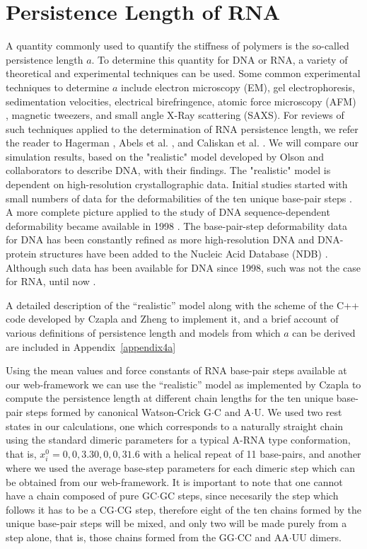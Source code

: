 \section{Persistence Length of RNA}
A quantity commonly used to  quantify the stiffness of polymers is the
so-called persistence  length $a$. To determine this  quantity for DNA
or RNA,  a variety of  theoretical and experimental techniques  can be
used.  Some  common experimental  techniques to determine  $a$ include
electron   microscopy   (EM),   gel   electrophoresis,   sedimentation
velocities, electrical birefringence,  atomic force microscopy (AFM) ,
magnetic  tweezers,  and small  angle  X-Ray  scattering (SAXS).   For
reviews  of  such  techniques  applied  to the  determination  of  RNA
persistence    length,    we   refer    the    reader   to    Hagerman
\cite{hagerman1997}, Abels  et al.  \cite{abels2005},  and Caliskan et
al.   \cite{caliskan2005}.  We  will compare  our  simulation results,
based on  the "realistic" model  developed by Olson  and collaborators
\cite{olson1995} to describe DNA, with their findings. The "realistic"
model is dependent  on high-resolution crystallographic data.  Initial
studies started with small numbers  of data for the deformabilities of
the  ten unique  base-pair  steps \cite{olson1995}.   A more  complete
picture applied  to the study of DNA  sequence-dependent deformability
became  available   in  1998  \cite{olson1998}.    The  base-pair-step
deformability  data  for  DNA  has  been constantly  refined  as  more
high-resolution DNA and DNA-protein  structures have been added to the
Nucleic Acid Database (NDB) \cite{balasubramanian2009}.  Although such
data has been available for DNA  since 1998, such was not the case for
RNA, until now \cite{olson2009}.

A detailed description of the  ``realistic'' model along with the scheme
of the C++  code developed by Czapla and Zheng to  implement it, and a
brief account of various  definitions of persistence length and models
from which $a$ can be derived are included in Appendix~\ref{appendix4a}

Using  the mean  values and  force  constants of  RNA base-pair  steps
available at our  web-framework we can use the  ``realistic'' model as
implemented by  Czapla to compute the persistence  length at different
chain lengths for  the ten unique base-pair steps  formed by canonical
Watson-Crick G$\cdot$C and  A$\cdot$U. We used two rest  states in our
calculations,  one which  corresponds  to a  naturally straight  chain
using  the  standard  dimeric  parameters  for a  typical  A-RNA  type
conformation, that is,  $x_{i}^{0} = {0, 0, 3.30, 0,  0, 31.6}$ with a
helical repeat of 11 base-pairs, and another where we used the average
base-step parameters for each dimeric  step which can be obtained from
our  web-framework. It is  important to  note that  one cannot  have a
chain composed  of pure GC$\cdot$GC  steps, since necesarily  the step
which follows it has to be  a CG$\cdot$CG step, therefore eight of the
ten chains  formed by  the unique base-pair  steps will be  mixed, and
only two will be made purely  from a step alone, that is, those chains
formed from the GG$\cdot$CC and AA$\cdot$UU dimers.

